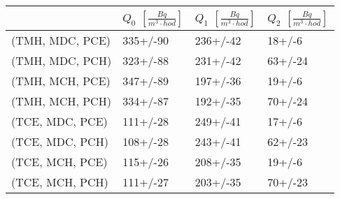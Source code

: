 \begin{tabular}{llll}
\toprule
{} & $Q_0$ $\left[\si{\frac{Bq}{m^3\cdot hod}}\right]$ & $Q_1$ $\left[\si{\frac{Bq}{m^3\cdot hod}}\right]$ & $Q_2$ $\left[\si{\frac{Bq}{m^3\cdot hod}}\right]$ \\
\midrule
(TMH, MDC, PCE) &                                          335+/-90 &                                          236+/-42 &                                            18+/-6 \\
(TMH, MDC, PCH) &                                          323+/-88 &                                          231+/-42 &                                           63+/-24 \\
(TMH, MCH, PCE) &                                          347+/-89 &                                          197+/-36 &                                            19+/-6 \\
(TMH, MCH, PCH) &                                          334+/-87 &                                          192+/-35 &                                           70+/-24 \\
(TCE, MDC, PCE) &                                          111+/-28 &                                          249+/-41 &                                            17+/-6 \\
(TCE, MDC, PCH) &                                          108+/-28 &                                          243+/-41 &                                           62+/-23 \\
(TCE, MCH, PCE) &                                          115+/-26 &                                          208+/-35 &                                            19+/-6 \\
(TCE, MCH, PCH) &                                          111+/-27 &                                          203+/-35 &                                           70+/-23 \\
\bottomrule
\end{tabular}
